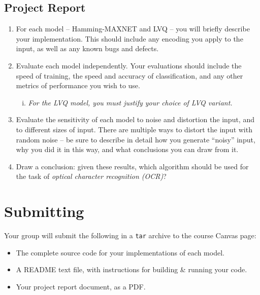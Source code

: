 \documentclass[11pt]{cselabheader}
\begin{document}
\subsection{Project Report}
\begin{enumerate}
  \item For each model -- Hamming-MAXNET and LVQ -- you will briefly describe your implementation. This should include any encoding you apply to the input, as well as any known bugs and defects.

  \item Evaluate each model independently. Your evaluations should include the speed of training, the speed and accuracy of classification, and any other metrics of performance you wish to use.
  \begin{enumerate}[i.]
    \item \textit{For the LVQ model, you must justify your choice of LVQ variant.}
  \end{enumerate}

  \item Evaluate the sensitivity of each model to noise and distortion the input, and to different sizes of input. There are multiple ways to distort the input with random noise -- be sure to describe in detail how you generate ``noisy'' input, why you did it in this way, and what conclusions you can draw from it.

  \item Draw a conclusion: given these results, which algorithm should be used for the task of \textit{optical character recognition (OCR)}?
\end{enumerate}



\pagebreak

\section{Submitting}

Your group will submit the following in a \texttt{tar} archive to the course Canvas page:
\begin{itemize}
  \item The complete source code for your implementations of each model.
  \item A README text file, with instructions for building \& running your code.
  \item Your project report document, as a PDF.
\end{itemize}
\end{document}
